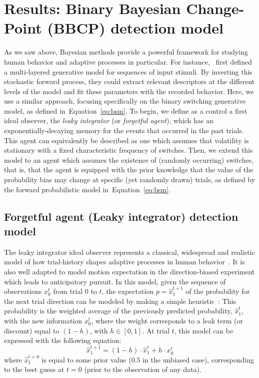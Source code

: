 \documentclass[10pt,letterpaper]{article}
\newcommand{\eql}[1]{\begin{equation}#1\end{equation}}
\newcommand{\citep}[1]{\cite{#1}}
\newcommand{\citet}[1]{\cite{#1}}
\newcommand{\seeEq}[1]{Equation~\ref{eq:#1}}
\begin{document}
\section{Results: Binary Bayesian Change-Point (BBCP) detection model}
\label{sec:Bayesian_change_point}
%
%
As we saw above, Bayesian methods provide a powerful framework for studying human behavior and adaptive  processes in particular.
For instance,~\citet{Mathys11} first defined a multi-layered generative model for
sequences of input stimuli.
By inverting this stochastic forward process,
they could extract relevant descriptors at the different levels of the model
and fit these parameters with the recorded behavior.
Here, we use a similar approach, focusing specifically on the binary switching generative model,
as defined in~\seeEq{bsm}.
To begin, we define as a control a first ideal observer, the \textit{leaky integrator} (or \textit{forgetful agent}),
which has an exponentially-decaying memory for the events that occurred in the past trials.
This agent can equivalently be described as one
which assumes that volatility is stationary with a fixed characteristic frequency of switches.
Then, we extend this model to an agent
which assumes the existence of (randomly occurring) switches, that is,
that the agent is equipped with the prior knowledge
that the value of the probability bias may change
at specific (yet randomly drawn) trials,
as defined by the forward probabilistic model in~\seeEq{bsm}.
%
\subsection{Forgetful agent (Leaky integrator) detection model}%
The leaky integrator ideal observer represents a classical, widespread and
realistic model of how trial-history shapes
adaptive processes in human behavior~\citet{Anderson2006}.
It is also well adapted to model motion expectation in the direction-biased experiment which leads to anticipatory pursuit.
In this model, given the sequence of observations $x_0^t$ from trial $0$ to $t$,
the expectation $p=\hat{x}_1^{t+1}$ of the probability for the next trial direction can be modeled by making a simple heuristic~\citep{Anderson2006}:
This probability is the weighted average of
the previously predicted probability, $\hat{x}_1^{t}$, with the new information $x_0^t$,
where the weight corresponds to a leak term (or discount)
equal to $(1 - h)$, with $h \in [0, 1]$.
At trial $t$, this model can be expressed with the following equation:
\eql{
\hat{x}_1^{t+1} = (1 - h) \cdot \hat{x}_1^{t} + h \cdot x_0^t
\label{eq:leaky}}
where $\hat{x}_1^{t=0}$ is equal to some prior value ($0.5$ in the unbiased case),
corresponding to the best guess at $t=0$ (prior to the observation of any data).
\end{document}
